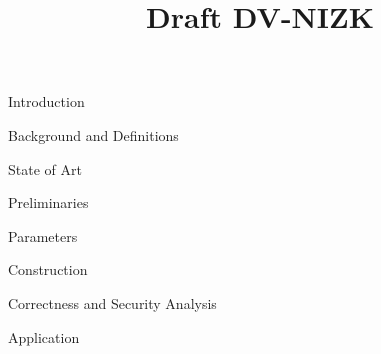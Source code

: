


\pagestyle{plain}

\title{Draft DV-NIZK}

\maketitle

\begin{section}{Introduction}
  
\end{section}

\begin{section}{Background and Definitions}
  
\end{section}

\begin{section}{State of Art}
  
\end{section}

\begin{section}{Preliminaries}
  
\end{section}

\begin{section}{Parameters}
  
\end{section}

\begin{section}{Construction}
  
\end{section}


\begin{section}{Correctness and Security Analysis}
  
\end{section}


\begin{section}{Application}
  
\end{section}




\begin{appendix}
  
\end{appendix}







